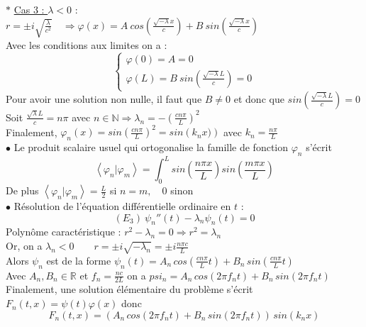 \documentclass[12pt]{article}
\begin{document}
\noindent $\ast$ \underline{Cas 3 : $\lambda<0$} : \\
$r=\pm i\sqrt{\frac{\lambda}{c^2}} \quad \Longrightarrow \varphi(x)=A\ cos\left(\frac{\sqrt{-\lambda} x}{c}\right) +B\ sin\left(\frac{\sqrt{-\lambda} x}{c}\right)$\\
Avec les conditions aux limites on a :
\begin{equation*}
	\begin{cases}
		\varphi(0)=A=0  \\
		\varphi(L)=B\ sin\left(\frac{\sqrt{-\lambda} L}{c}\right)=0
	\end{cases}
\end{equation*}
Pour avoir une solution non nulle, il faut que $B \neq 0$ et donc que $sin\left(\frac{\sqrt{-\lambda} L}{c}\right)=0$ \\
Soit $\frac{\sqrt{\lambda}L}{c}=n\pi$ avec $n \in \mathbb{N} \Longrightarrow \lambda_n=-\left(\frac{cn\pi}{L}\right)^2$ \\
Finalement, $\boxed{\varphi_n(x)= sin \left(\frac{cn\pi}{L}\right)^2=sin \left(k_n x)\right)}$ avec $k_n=\frac{n\pi}{L}$ \\

\noindent $\bullet$ Le produit scalaire usuel qui ortogonalise la famille de fonction $\varphi_n$ s'écrit
\begin{equation*}
\left\langle \varphi_n \vert \varphi_m \right\rangle = \int_{0}^{L} sin \left(\frac{n\pi x}{L}\right) sin \left(\frac{m\pi x}{L}\right)
\end{equation*}
De plus $\left\langle \varphi_n \vert \varphi_m \right\rangle=\frac{L}{2}$ si $n=m, \quad 0$ sinon \\

\noindent $\bullet$ Résolution de l'équation différentielle ordinaire en $t$ :
\begin{equation}
	(E_3) \ \psi_n''(t)-\lambda_n \psi_n(t)=0
\end{equation}
Polynôme caractéristique : $r^2-\lambda_n =0 \Longrightarrow r^2=\lambda_n$ \\
Or, on a $\displaystyle \lambda_n<0 \qquad r=\pm i\sqrt{-\lambda_n}=\pm i \frac{n\pi c}{L}$\\
Alors $\psi_n$ est de la forme $\displaystyle \boxed{\psi_n(t)= A_n \, cos \left(\frac{cn\pi}{L}t\right)+B_n \, sin \left(\frac{cn\pi}{L}t\right)}$ \\[0.2cm]
Avec $A_n, B_n \in \mathbb{R}$ et $f_n=\frac{nc}{2L}$ on a $psi_n=A_n \, cos \left(2\pi f_n t\right)+B_n \, sin \left(2\pi f_n t\right)$ \\
Finalement, une solution élémentaire du problème s'écrit $F_n(t,x)=\psi(t)\varphi(x)$ donc
\begin{equation*}
	F_n(t,x)=\left( A_n \, cos \left(2\pi f_n t\right)+B_n \, sin \left(2\pi f_n t\right)\right)\,sin(k_n x)
\end{equation*}
\end{document}
